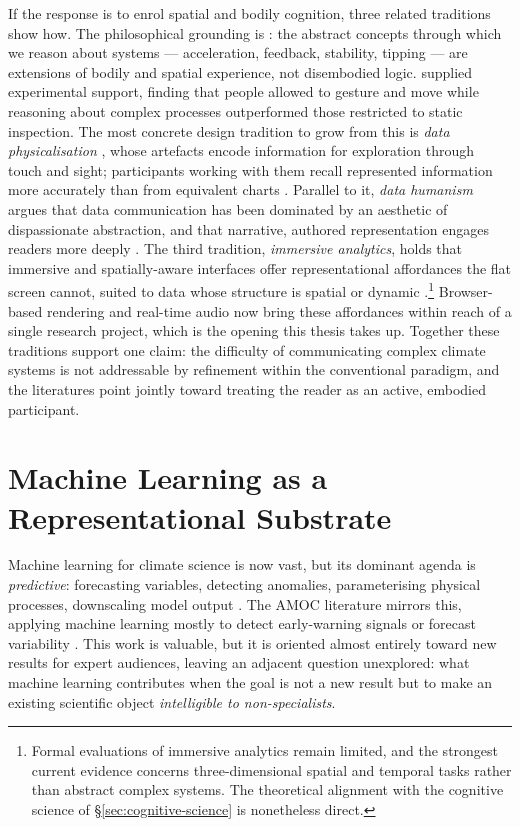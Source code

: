 If the response is to enrol spatial and bodily cognition, three related traditions show how. The philosophical grounding is \citet{lakoff1999}: the abstract concepts through which we reason about systems --- acceleration, feedback, stability, tipping --- are extensions of bodily and spatial experience, not disembodied logic. \citet{kirsh2013} supplied experimental support, finding that people allowed to gesture and move while reasoning about complex processes outperformed those restricted to static inspection. The most concrete design tradition to grow from this is \emph{data physicalisation} \citep{jansen2015}, whose artefacts encode information for exploration through touch and sight; participants working with them recall represented information more accurately than from equivalent charts \citep{moere2010}. Parallel to it, \emph{data humanism} argues that data communication has been dominated by an aesthetic of dispassionate abstraction, and that narrative, authored representation engages readers more deeply \citep{lupi2017, segel2010}. The third tradition, \emph{immersive analytics}, holds that immersive and spatially-aware interfaces offer representational affordances the flat screen cannot, suited to data whose structure is spatial or dynamic \citep{marriott2018}.\footnote{Formal evaluations of immersive analytics remain limited, and the strongest current evidence concerns three-dimensional spatial and temporal tasks rather than abstract complex systems. The theoretical alignment with the cognitive science of \S\ref{sec:cognitive-science} is nonetheless direct.} Browser-based rendering and real-time audio now bring these affordances within reach of a single research project, which is the opening this thesis takes up. Together these traditions support one claim: the difficulty of communicating complex climate systems is not addressable by refinement within the conventional paradigm, and the literatures point jointly toward treating the reader as an active, embodied participant.
 
\section{Machine Learning as a Representational Substrate}
\label{sec:ml-climate}
 
Machine learning for climate science is now vast, but its dominant agenda is \emph{predictive}: forecasting variables, detecting anomalies, parameterising physical processes, downscaling model output \citep{reichstein2019, sonnewald2021}. The AMOC literature mirrors this, applying machine learning mostly to detect early-warning signals or forecast variability \citep{boers2021, ditlevsen2023}. This work is valuable, but it is oriented almost entirely toward new results for expert audiences, leaving an adjacent question unexplored: what machine learning contributes when the goal is not a new result but to make an existing scientific object \emph{intelligible to non-specialists}.
 
